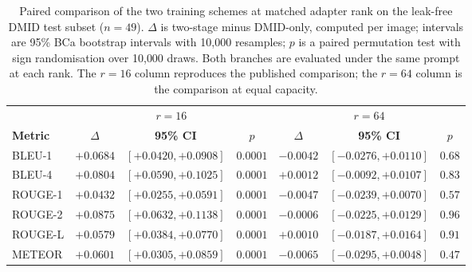 \documentclass{wlscirep}
\begin{document}
\begin{table}[H]
\centering
\caption{Paired comparison of the two training schemes at matched adapter rank on the leak-free DMID test subset ($n=49$). $\Delta$ is two-stage minus DMID-only, computed per image; intervals are 95\% BCa bootstrap intervals with 10{,}000 resamples; $p$ is a paired permutation test with sign randomisation over 10{,}000 draws. Both branches are evaluated under the same prompt at each rank. The $r=16$ column reproduces the published comparison; the $r=64$ column is the comparison at equal capacity.}
\label{tab:equalcap}
\begin{adjustbox}{max width=\textwidth}
\begin{tabular}{lcccccc}
\toprule
& \multicolumn{3}{c}{$r=16$} & \multicolumn{3}{c}{$r=64$} \\
\cmidrule(lr){2-4} \cmidrule(lr){5-7}
\textbf{Metric} & $\Delta$ & \textbf{95\% CI} & $p$ & $\Delta$ & \textbf{95\% CI} & $p$ \\
\midrule
BLEU-1 & $+0.0684$ & $[+0.0420, +0.0908]$ & $0.0001$ & $-0.0042$ & $[-0.0276, +0.0110]$ & $0.68$ \\
BLEU-4 & $+0.0804$ & $[+0.0590, +0.1025]$ & $0.0001$ & $+0.0012$ & $[-0.0092, +0.0107]$ & $0.83$ \\
ROUGE-1 & $+0.0432$ & $[+0.0255, +0.0591]$ & $0.0001$ & $-0.0047$ & $[-0.0239, +0.0070]$ & $0.57$ \\
ROUGE-2 & $+0.0875$ & $[+0.0632, +0.1138]$ & $0.0001$ & $-0.0006$ & $[-0.0225, +0.0129]$ & $0.96$ \\
ROUGE-L & $+0.0579$ & $[+0.0384, +0.0770]$ & $0.0001$ & $+0.0010$ & $[-0.0187, +0.0164]$ & $0.91$ \\
METEOR & $+0.0601$ & $[+0.0305, +0.0859]$ & $0.0001$ & $-0.0065$ & $[-0.0295, +0.0048]$ & $0.47$ \\
\bottomrule
\end{tabular}
\end{adjustbox}
\end{table}
\end{document}
